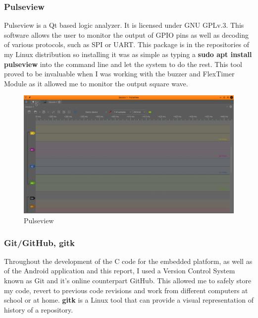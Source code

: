 \documentclass[12pt,a4paper]{article}
\begin{document}
            \subsubsection{Pulseview}
            Pulseview is a Qt based logic analyzer. It is licensed under GNU GPLv.3. This software  
            allows the user to monitor the output of GPIO pins as well as decoding of various protocols,
            such as SPI or UART. This package is in the repositories of my Linux distribution so 
            installing it was as simple as typing a {\bfseries sudo apt install pulseview} into the command line and let the system to do the rest. This tool proved to be invaluable when 
            I was working with the buzzer and FlexTimer Module as it allowed me to monitor the output
            square wave.
            
            \begin{figure}[h]
                \centering
                \includegraphics[width=\textwidth]{pulseview}
                \caption{Pulseview}
                \label{fig:pulseView}
            \end{figure}
        
            \subsubsection{Git/GitHub, gitk}
            Throughout the development of the C code for the embedded platform, as well as of the 
            Android application and this report, I used a Version Control System known as Git and 
            it's online counterpart GitHub. This allowed me to safely store my code, revert to 
            previous code revisions and work from different computers at school or at home. {\bfseries gitk} is a Linux tool that can provide a visual representation of history of a repository.
            
\end{document}
